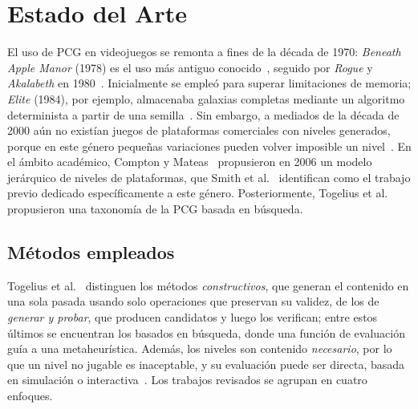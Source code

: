 \documentclass[letter, 10pt]{article}
\begin{document}
\section{Estado del Arte}
\label{sec:ea}

El uso de PCG en videojuegos se remonta a fines de la d\'ecada de 1970: \emph{Beneath Apple Manor} (1978) es el uso m\'as antiguo conocido~\cite{Summerville2016}, seguido por \emph{Rogue} y \emph{Akalabeth} en 1980~\cite{DePontes2022}. Inicialmente se emple\'o para superar limitaciones de memoria; \emph{Elite} (1984), por ejemplo, almacenaba galaxias completas mediante un algoritmo determinista a partir de una semilla~\cite{Togelius2011, DePontes2022}. Sin embargo, a mediados de la d\'ecada de 2000 a\'un no exist\'ian juegos de plataformas comerciales con niveles generados, porque en este g\'enero peque\~nas variaciones pueden volver imposible un nivel~\cite{Compton2006}. En el \'ambito acad\'emico, Compton y Mateas~\cite{Compton2006} propusieron en 2006 un modelo jer\'arquico de niveles de plataformas, que Smith et al.~\cite{Smith2011} identifican como el trabajo previo dedicado espec\'ificamente a este g\'enero. Posteriormente, Togelius et al.~\cite{Togelius2011} propusieron una taxonom\'ia de la PCG basada en b\'usqueda.

\subsection{M\'etodos empleados}

Togelius et al.~\cite{Togelius2011} distinguen los m\'etodos \emph{constructivos}, que generan el contenido en una sola pasada usando solo operaciones que preservan su validez, de los de \emph{generar y probar}, que producen candidatos y luego los verifican; entre estos \'ultimos se encuentran los basados en b\'usqueda, donde una funci\'on de evaluaci\'on gu\'ia a una metaheur\'istica. Adem\'as, los niveles son contenido \emph{necesario}, por lo que un nivel no jugable es inaceptable, y su evaluaci\'on puede ser directa, basada en simulaci\'on o interactiva~\cite{Togelius2011}. Los trabajos revisados se agrupan en cuatro enfoques.
\end{document}
